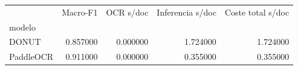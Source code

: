 \begin{tabular}{lrrrr}
\toprule
 & Macro-F1 & OCR s/doc & Inferencia s/doc & Coste total s/doc \\
modelo &  &  &  &  \\
\midrule
DONUT & 0.857000 & 0.000000 & 1.724000 & 1.724000 \\
PaddleOCR & 0.911000 & 0.000000 & 0.355000 & 0.355000 \\
\bottomrule
\end{tabular}
